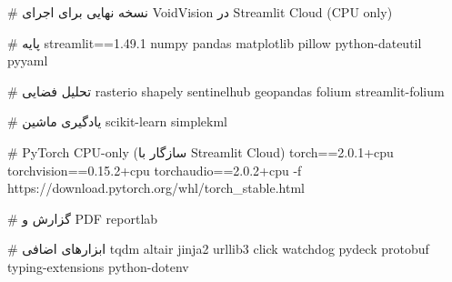 # نسخه نهایی برای اجرای VoidVision در Streamlit Cloud (CPU only)

# پایه
streamlit==1.49.1
numpy
pandas
matplotlib
pillow
python-dateutil
pyyaml

# تحلیل فضایی
rasterio
shapely
sentinelhub
geopandas
folium
streamlit-folium

# یادگیری ماشین
scikit-learn
simplekml

# PyTorch CPU-only (سازگار با Streamlit Cloud)
torch==2.0.1+cpu
torchvision==0.15.2+cpu
torchaudio==2.0.2+cpu
-f https://download.pytorch.org/whl/torch_stable.html

# گزارش و PDF
reportlab

# ابزارهای اضافی
tqdm
altair
jinja2
urllib3
click
watchdog
pydeck
protobuf
typing-extensions
python-dotenv
